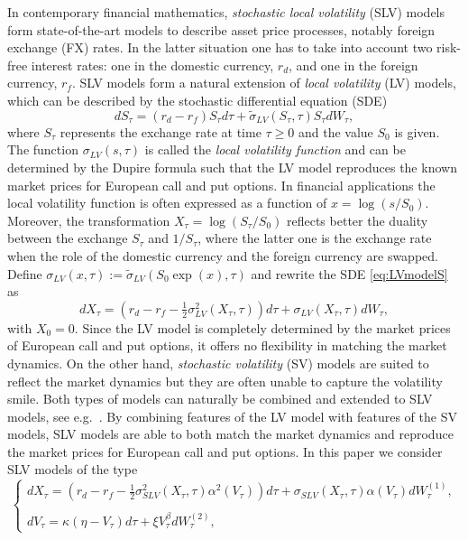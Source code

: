 \documentclass[10pt]{article}
\begin{document}
In contemporary financial mathematics, \textit{stochastic local volatility} (SLV) models form state-of-the-art models to describe asset price processes, notably foreign exchange (FX) rates. In the latter situation one has to take into account two risk-free interest rates: one in the domestic currency, $r_{d}$, and one in the foreign currency, $r_{f}$. SLV models form a natural extension of \textit{local volatility} (LV) models, which can be described by the stochastic differential equation (SDE)
\begin{equation}
dS_{\tau} = (r_{d} - r_{f})S_{\tau} d\tau + \tilde{\sigma}_{LV}(S_{\tau},\tau) S_{\tau} dW_{\tau},
\label{eq:LVmodelS}
\end{equation}
where $S_{\tau}$ represents the exchange rate at time $\tau \ge 0$ and the value $S_{0}$ is given. The function $\sigma_{LV}(s,\tau)$ is called the \textit{local volatility function} and can be determined by the Dupire formula \cite{D94} such that the LV model reproduces the known market prices for European call and put options. In financial applications the local volatility function is often expressed as a function of $x= \log(s/S_{0})$. Moreover, the transformation $X_{\tau} = \log(S_{\tau}/S_{0})$ reflects better the duality between the exchange $S_{\tau}$ and $1/S_{\tau}$, where the latter one is the exchange rate when the role of the domestic currency and the foreign currency are swapped.
Define $\sigma_{LV}(x,\tau):=\tilde{\sigma}_{LV}(S_{0}\exp(x),\tau)$ and rewrite the SDE \eqref{eq:LVmodelS} as
\begin{equation}
dX_{\tau} = (r_{d} - r_{f} - \tfrac{1}{2} \sigma_{LV}^{2}(X_{\tau},\tau) ) d\tau + \sigma_{LV}(X_{\tau},\tau) dW_{\tau},
\label{eq:LVmodel}
\end{equation}
with $X_{0}=0$. Since the LV model is completely determined by the market prices of European call and put options, it offers no flexibility in matching the market dynamics. On the other hand, \textit{stochastic volatility} (SV) models are suited to reflect the market dynamics but they are often unable to capture the volatility smile. Both types of models can naturally be combined and extended to SLV models, see e.g.\ \cite{L02,TF10}. 
By combining features of the LV model with features of the SV models, SLV models are able to both match the market dynamics and reproduce the market prices for European call and put options. In this paper we consider SLV models of the type
\begin{equation}
\left\{ \begin{array}{l}
dX_{\tau} = (r_{d} - r_{f} - \tfrac{1}{2}\sigma^{2}_{SLV} (X_{\tau},\tau) \alpha^{2}(V_{\tau})) d\tau + \sigma_{SLV} (X_{\tau},\tau) \alpha(V_{\tau}) dW^{(1)}_{\tau}, \\\\
dV_{\tau} = \kappa (\eta - V_{\tau}) d\tau + \xi V_{\tau}^{\beta} dW^{(2)}_{\tau},
\end{array} \right.
\label{eq:SLVmodel}
\end{equation}
\end{document}
